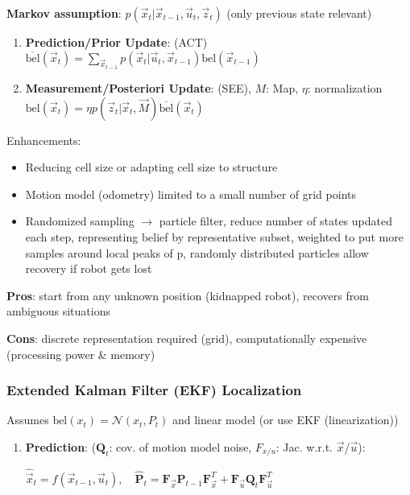 \documentclass[fontsize=6pt]{scrartcl}
\newcommand{\mat}[1]{\mathbf{#1}}
\begin{document}
\begin{multicols*}{4}
\textbf{Markov assumption}: $p(\vec x_t|\vec x_{t-1}, \vec u_t, \vec z_t)$ (only previous state relevant)

\begin{enumerate}
	\item \textbf{Prediction/Prior Update}: (ACT)\\
	$\overline{\text{bel}}(\vec x_t) = \sum_{\vec x_{t-1}} p(\vec x_t | \vec u_t, \vec x_{t-1}) \text{bel}(\vec x_{t-1})$
	\item \textbf{Measurement/Posteriori Update}: (SEE), $M$: Map, $\eta$: normalization\\
	$\text{bel}(\vec x_t) = \eta p(\vec z_t| \vec x_t, \vec M) \overline{\text{bel}}(\vec x_{t})$
\end{enumerate}

Enhancements:
\begin{itemize}
	\item Reducing cell size or adapting cell size to structure
	\item Motion model (odometry) limited to a small number of grid points
	\item Randomized sampling $\rightarrow$ particle filter, reduce number of states updated each step, representing belief by representative subset, weighted to put more samples around local peaks of p, randomly distributed particles allow recovery if robot gets lost
\end{itemize}

\textbf{Pros}:	start from any unknown position (kidnapped robot), recovers from ambiguous situations

\textbf{Cons}:	discrete representation required (grid), computationally expensive (processing power \& memory)


\subsubsection*{Extended Kalman Filter (EKF) Localization}
Assumes $\text{bel}(x_t) = \mathcal N (x_t, P_t)$ and linear model (or use EKF (linearization))

\begin{enumerate}
	\item \textbf{Prediction}: ($\mat Q_t$: cov. of motion model
	noise, $F_{x/u}$: Jac. w.r.t. $\vec x$/$\vec u$):
\begin{center}
	$
	\hat{\vec x}_t = f(\vec x_{t-1}, \vec u_t), \quad
	\hat{\mat P}_t =
	\mat F_{\vec x} \mat P_{t-1} \mat F_{\vec x}^T
	+
	\mat F_{\vec u} \mat Q_{t} \mat F_{\vec u}^T
	$
\end{center}


\end{enumerate}
\end{multicols*}
\end{document}
